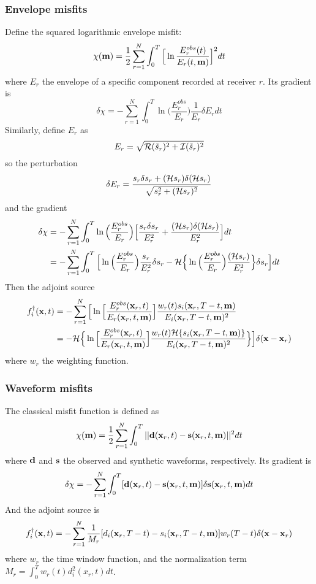 \subsubsection{Envelope misfits}
Define the squared logarithmic envelope misfit:
\[ \chi(\mathbf{m})=\frac{1}{2}\sum_{r=1}^N\int_0^T\Big[\ln\frac{E_r^{obs}(t)}{E_r(t,\mathbf{m})}\Big]^2dt \]
where $E_r$ the envelope of a specific component recorded at receiver $r$.
Its gradient is
\[ \delta\chi=-\sum_{r=1}^N\int_0^T\ln\Big(\frac{E_r^{obs}}{E_r}\Big)\frac{1}{E_r}\delta E_rdt \]
Similarly, define $E_r$ as
\[ E_r=\sqrt{\mathcal{R}(\tilde s_r)^2+\mathcal{I}(\tilde s_r)^2} \]
so the perturbation
\[ \delta E_r=\frac{s_r\delta s_r+(\mathcal{H} s_r)\delta(\mathcal{H} s_r)}{\sqrt{s_r^2+(\mathcal{H} s_r)^2}} \]
and the gradient
\begin{align*}
  \delta\chi & =-\sum_{r=1}^N\int_0^T\ln\Big(\frac{E_r^{obs}}{E_r}\Big)\Big[\frac{s_r\delta s_r}{E_r^2}+\frac{(\mathcal{H} s_r)\delta(\mathcal{H} s_r)}{E_r^2}\Big]dt \\
    & =-\sum_{r=1}^N\int_0^T\Big[\ln\Big(\frac{E_r^{obs}}{E_r}\Big)\frac{s_r}{E_r^2}\delta s_r-\mathcal{H}\Big\{\ln\Big(\frac{E_r^{obs}}{E_r}\Big)\frac{(\mathcal{H} s_r)}{E_r^2}\Big\}\delta s_r\Big]dt \\
\end{align*}
Then the adjoint source
\begin{align*}
  f_i^\dagger(\mathbf{x},t) & =-\sum_{r=1}^N\Big[\ln\Big[\frac{E_r^{obs}(\mathbf{x}_r,t)}{E_r(\mathbf{x}_r,t,\mathbf{m})}\Big]\frac{w_r(t)s_i(\mathbf{x}_r,T-t,\mathbf{m})}{E_i(\mathbf{x}_r,T-t,\mathbf{m})^2} \\
    & =-\mathcal{H}\Big\{\ln\Big[\frac{E_r^{obs}(\mathbf{x}_r,t)}{E_r(\mathbf{x}_r,t,\mathbf{m})}\Big]\frac{w_r(t)\mathcal{H}\{s_i(\mathbf{x}_r,T-t,\mathbf{m})\}}{E_i(\mathbf{x}_r,T-t,\mathbf{m})^2}\Big\}\Big]\delta(\mathbf{x}-\mathbf{x}_r) \\
\end{align*}
where $w_r$ the weighting function.

\subsubsection{Waveform misfits}
The classical misfit function is defined as
\[ \chi(\mathbf{m})=\frac{1}{2}\sum_{r=1}^N\int_0^T||\mathbf{d}(\mathbf{x}_r,t)-\mathbf{s}(\mathbf{x}_r,t,\mathbf{m})||^2dt \]
where $\mathbf{d}$ and $\mathbf{s}$ the observed and synthetic waveforms, respectively.
Its gradient is
\[ \delta\chi=-\sum_{r=1}^N\int_0^T[\mathbf{d}(\mathbf{x}_r,t)-\mathbf{s}(\mathbf{x}_r,t,\mathbf{m})]\delta\mathbf{s}(\mathbf{x}_r,t,\mathbf{m})dt \]
And the adjoint source is
\[ f_i^\dagger(\mathbf{x},t)=-\sum_{r=1}^N\frac{1}{M_r}[d_i(\mathbf{x}_r,T-t)-s_i(\mathbf{x}_r,T-t,\mathbf{m})]w_r(T-t)\delta(\mathbf{x}-\mathbf{x}_r) \]
where $w_r$ the time window function,
and the normalization term $M_r=\int_0^Tw_r(t)d_i^2(x_r,t)dt$.


